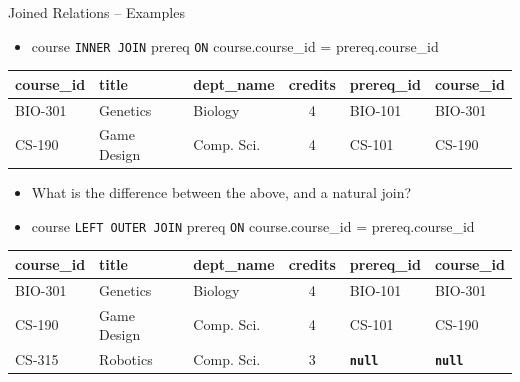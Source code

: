 \documentclass[aspectratio=169]{beamer}
\begin{document}
\begin{frame}{Joined Relations – Examples}
    \normalsize
    \begin{itemize}
        \item course \texttt{INNER JOIN} prereq \texttt{ON} course.course\_id = prereq.course\_id
    \end{itemize}
    \scriptsize
    \begin{tabular}{| l | l | l | c | l | l |}
        \hline
        \textbf{course\_id} & \textbf{title} & \textbf{dept\_name} & \textbf{credits} & \textbf{prereq\_id} & \textbf{course\_id} \\
        \hline
        BIO-301 & Genetics    & Biology    & 4 & BIO-101 & BIO-301 \\
        \hline
        CS-190  & Game Design & Comp. Sci. & 4 & CS-101  & CS-190  \\
        \hline
    \end{tabular}
    \normalsize
    \begin{itemize}
        \item What is the difference between the above, and a natural join?
        \vspace{2mm}
        \item course \texttt{LEFT OUTER JOIN} prereq \texttt{ON} course.course\_id = prereq.course\_id
    \end{itemize}
    \scriptsize
    \begin{tabular}{| l | l | l | c | l | l |}
        \hline
        \textbf{course\_id} & \textbf{title} & \textbf{dept\_name} & \textbf{credits} & \textbf{prereq\_id} & \textbf{course\_id} \\
        \hline
        BIO-301 & Genetics    & Biology    & 4 & BIO-101 & BIO-301 \\
        \hline
        CS-190  & Game Design & Comp. Sci. & 4 & CS-101 & CS-190  \\
        \hline
        CS-315  & Robotics    & Comp. Sci. & 3 & \textbf{\texttt{null}} & \textbf{\texttt{null}} \\
        \hline
    \end{tabular}
\end{frame}
\end{document}
